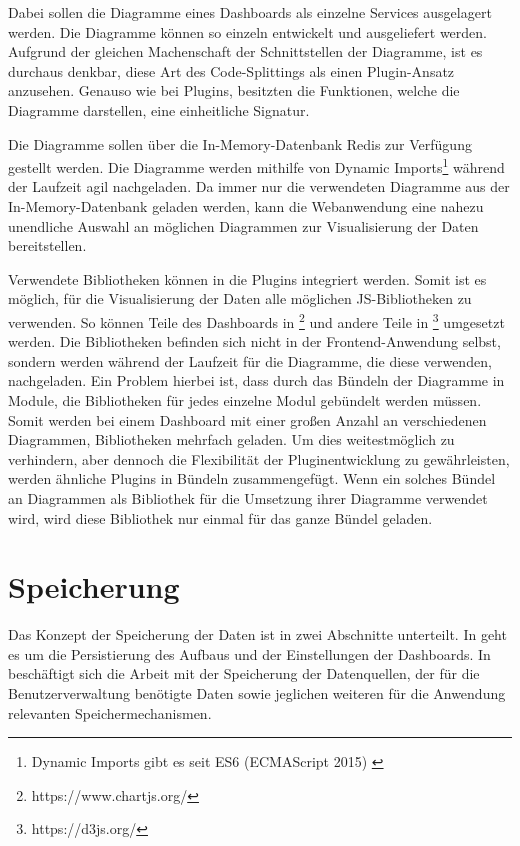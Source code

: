 Dabei sollen die Diagramme eines Dashboards als einzelne Services ausgelagert werden.
Die Diagramme können so einzeln entwickelt und ausgeliefert werden. Aufgrund der
gleichen Machenschaft der Schnittstellen der Diagramme, ist es durchaus denkbar, diese Art des Code-Splittings als
einen Plugin-Ansatz anzusehen. Genauso wie bei Plugins, besitzten die Funktionen, welche die
Diagramme darstellen, eine einheitliche Signatur.

Die Diagramme sollen über die In-Memory-Datenbank Redis zur Verfügung gestellt werden. Die Diagramme werden mithilfe
von Dynamic Imports\footnote{Dynamic Imports gibt es seit ES6 (ECMAScript 2015) \cite{DynamicImportsV8}}
während der Laufzeit agil nachgeladen. Da immer nur die verwendeten Diagramme aus der In-Memory-Datenbank
geladen werden, kann die Webanwendung eine nahezu unendliche Auswahl an möglichen Diagrammen zur Visualisierung
der Daten bereitstellen.

Verwendete Bibliotheken können in die Plugins integriert werden. Somit ist es möglich, für die Visualisierung
der Daten alle möglichen JS-Bibliotheken zu verwenden. So können Teile des Dashboards
in \footnote{https://www.chartjs.org/} und andere Teile in \footnote{https://d3js.org/}
umgesetzt werden. Die Bibliotheken befinden sich nicht in der Frontend-Anwendung selbst,
sondern werden während der Laufzeit für die Diagramme, die diese verwenden, nachgeladen.
Ein Problem hierbei ist, dass durch das Bündeln der Diagramme in Module, die Bibliotheken für jedes einzelne
Modul gebündelt werden müssen. Somit werden bei einem Dashboard mit einer großen Anzahl an verschiedenen
Diagrammen, Bibliotheken mehrfach geladen. Um dies weitestmöglich zu verhindern, aber dennoch die Flexibilität
der Pluginentwicklung zu gewährleisten, werden ähnliche Plugins in Bündeln zusammengefügt. Wenn ein solches
Bündel an Diagrammen  als Bibliothek für die Umsetzung ihrer Diagramme verwendet wird, wird diese
Bibliothek nur einmal für das ganze Bündel geladen.

\section{Speicherung}
\label{sec:speicherung}
Das Konzept der Speicherung der Daten ist in zwei Abschnitte unterteilt.
In  geht es um die Persistierung des Aufbaus und der
Einstellungen der Dashboards. In  beschäftigt
sich die Arbeit mit der Speicherung der Datenquellen, der für die Benutzerverwaltung benötigte Daten
sowie jeglichen weiteren für die Anwendung relevanten Speichermechanismen.

